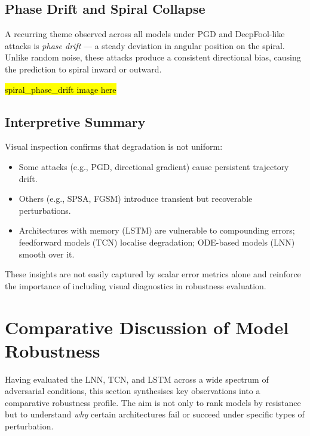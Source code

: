 \subsection*{Phase Drift and Spiral Collapse}

A recurring theme observed across all models under PGD and DeepFool-like attacks is \emph{phase drift} — a steady deviation in angular position on the spiral. Unlike random noise, these attacks produce a consistent directional bias, causing the prediction to spiral inward or outward.

\hl{spiral\_phase\_drift image here}


\subsection*{Interpretive Summary}

Visual inspection confirms that degradation is not uniform:
\begin{itemize}
    \item Some attacks (e.g., PGD, directional gradient) cause persistent trajectory drift.
    \item Others (e.g., SPSA, FGSM) introduce transient but recoverable perturbations.
    \item Architectures with memory (LSTM) are vulnerable to compounding errors; feedforward models (TCN) localise degradation; ODE-based models (LNN) smooth over it.
\end{itemize}

These insights are not easily captured by scalar error metrics alone and reinforce the importance of including visual diagnostics in robustness evaluation.

\section{Comparative Discussion of Model Robustness}

Having evaluated the LNN, TCN, and LSTM across a wide spectrum of adversarial conditions, this section synthesises key observations into a comparative robustness profile. The aim is not only to rank models by resistance but to understand \emph{why} certain architectures fail or succeed under specific types of perturbation.

